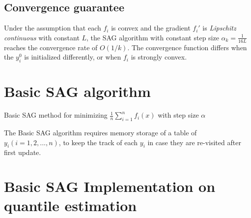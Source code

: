 \subsection{Convergence guarantee}

Under the assumption that each $f_i$ is convex and the gradient $f_i\prime$ is \textit{Lipschitz continuous} with constant $L$, the SAG algorithm with constant step size $\alpha_k = \frac{1}{16L}$ reaches the convergence rate of $O(1/k)$. The convergence function differs when the $y_i^0$ is initialized differently, or when $f_i$ is strongly convex.


\section{Basic SAG algorithm}

\begin{algorithm}
    \caption{Basic SAG method for minimizing $\frac{1}{n} \sum^n_{i=1}f_i(x)$ with step size $\alpha$}\label{alg:SAG_ori}
        \begin{algorithmic}[1]
                       
            \EndFor
        \end{algorithmic}
\end{algorithm}

The Basic SAG algorithm requires memory storage of a table of $y_i (i= 1, 2, ...,n)$, to keep the track of each $y_i$ in case they are re-visited after first update.

\section{Basic SAG Implementation on quantile estimation}

